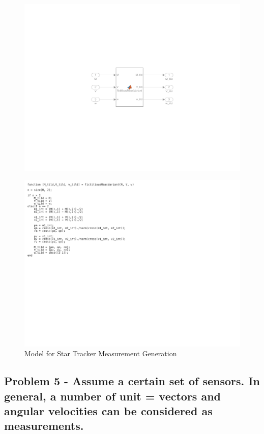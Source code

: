 \begin{figure}[H]
    \centering
    \captionsetup{ justification = centering }
    \includegraphics[trim={8cm 8cm 8cm 8cm},clip,width = 12cm]{Images/PS6/fict_meas.png}
\end{figure}

\begin{figure}[H]
    \centering
    \captionsetup{ justification = centering }
    \includegraphics[trim={0cm 10cm 10cm 0cm},clip,width = 15cm]{Images/PS6/fict_meas_code.png}
    \caption{Model for Star Tracker Measurement Generation}
    \label{fig:fictitious_meas}
\end{figure}

\subsection{Problem 5 - Assume a certain set of sensors. In general, a number of unit = vectors and angular velocities can be considered as measurements.}


